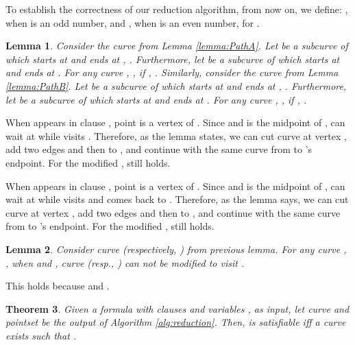 \documentclass[12pt]{dalthesis}
\def\favoritefont{\bfseries \sffamily}
\def\QED{\ensuremath{{\Box}}}
\def\markatright#1{\leavevmode\unskip\nobreak\quad\hspace*{\fill}{#1}}
\newenvironment{proof}
	{\begin{trivlist}\item[\hskip\labelsep{\favoritefont Proof:}]}
	{\markatright{\QED}\end{trivlist}}
\newtheorem{theorem}{Theorem}
\newtheorem{lemma}[theorem]{Lemma}
\begin{document}
\noindent To establish the correctness of
our reduction algorithm, 
from now on, we define:
,  
 when  is an odd number, 
and
, 
when  is an even number, for .


\begin{lemma}\label{lemma:ABCanSeeC}
Consider the curve  from Lemma \ref{lemma:PathA}. Let 
 be a subcurve of  which starts at  and ends at , .
Furthermore, let  be a subcurve of  which starts at  and ends at .
For any curve  , ,
if , 
. 
Similarly, consider the curve  from Lemma \ref{lemma:PathB}. Let 
 be a subcurve of  which starts at  and ends at , .
Furthermore, let  be a subcurve of  which starts at  and ends at .
For any curve  , ,
if ,   
. 
\end{lemma}

\begin{proof}
When  appears in clause , point  is 
a vertex of . 
Since  and  is the  midpoint of 
 ,
 can wait at  while  visits .
Therefore, as the lemma states, 
we can cut curve  at vertex ,
add two edges 
and then  to ,
and continue with the same 
curve 
from  to 's endpoint. 
For the 
modified , still  holds. 

When  appears in clause , point  is 
a vertex of . 
Since  and  is the  midpoint of 
 ,
 can wait at  while  visits 
and comes back to .
Therefore, as the lemma says, 
we can cut curve  at vertex ,
add two edges 
and then  to ,
and continue with the same 
curve 
from  to 's endpoint. 
For the 
modified , still  holds. 


\end{proof}



\begin{lemma}\label{lemma:NOTABCanSeeC}
Consider curve  (respectively, ) from previous lemma.
For any curve , ,
when  and ,   
curve  (resp., ) can not be modified to visit .
\end{lemma}
\begin{proof}
This holds because 
and .

\end{proof}










\vspace{0.1 in}

\begin{theorem}
Given a formula  with  clauses  and  variables ,
as input, let curve  and pointset  be the output of Algorithm \ref{alg:reduction}. 
Then,  is satisfiable iff a 
curve  exists such that 
.
\end{theorem}
\end{document}
